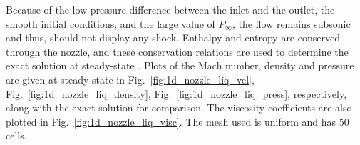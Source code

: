 \documentclass[preprint,10pt]{elsarticle}
\newcommand{\fig}[1]{Fig.~\ref{#1}}                      %
\begin{document}
Because of the low pressure difference between the inlet and the outlet, the smooth initial conditions, and the large value of $P_{\infty}$, the flow remains subsonic and thus, should not display any shock. Enthalpy and entropy are conserved through the nozzle, and these conservation relations are used to determine the exact solution at steady-state \cite{nozzle_exact}.
Plots of the Mach number, density and pressure are given at steady-state in \fig{fig:1d_nozzle_liq_vel}, \fig{fig:1d_nozzle_liq_density}, \fig{fig:1d_nozzle_liq_press}, respectively, along with the exact solution for comparison. The viscosity coefficients are also plotted in \fig{fig:1d_nozzle_liq_visc}. The mesh used is uniform and has $50$ cells.
\end{document}
